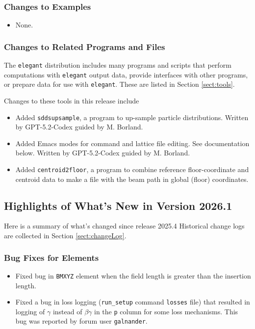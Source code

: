 \documentclass[11pt]{article}
\begin{document}
\subsubsection{Changes to Examples}

\begin{itemize}
\item None.
\end{itemize}

\subsubsection{Changes to Related Programs and Files}

The {\tt elegant} distribution includes many programs and scripts that perform computations with {\tt elegant}
output data, provide interfaces with other programs, or prepare data for use with {\tt elegant}. These
are listed in Section \ref{sect:tools}. 

Changes to these tools in this release include
\begin{itemize}
\item Added \verb|sddsupsample|, a program to up-sample particle distributions. Written by GPT-5.2-Codex guided by M. Borland.
\item Added Emacs modes for command and lattice file editing. See documentation below. Written by GPT-5.2-Codex guided by M. Borland.
\item Added \verb|centroid2floor|, a program to combine reference floor-coordinate and centroid data to make a file
  with the beam path in global (floor) coordinates.
\end{itemize}

\subsection{Highlights of What's New in Version 2026.1}

Here is a summary of what's changed since release 2025.4  Historical change logs are collected in Section
\ref{sect:changeLog}.

\subsubsection{Bug Fixes for Elements}

\begin{itemize}
\item Fixed bug in \verb|BMXYZ| element when the field length is greater than the insertion length.
\item Fixed a bug in loss logging (\verb|run_setup| command \verb|losses| file) that resulted in
  logging of $\gamma$ instead of $\beta\gamma$ in the \verb|p| column for some loss mechanisms.
  This bug was reported by forum user \verb|galnander|.
\end{itemize}
\end{document}
